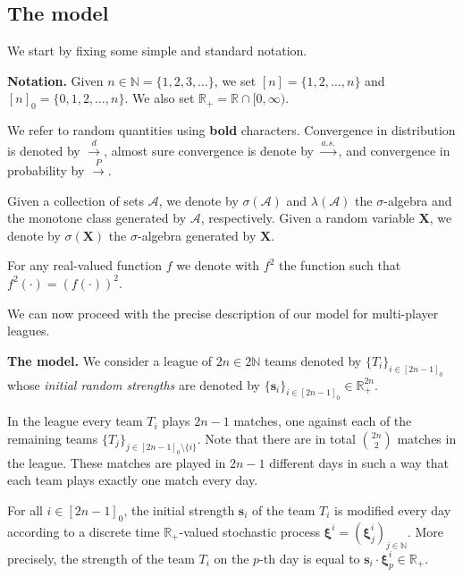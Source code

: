 \documentclass[11pt,a4paper,oneside]{article}
\theoremstyle{definition}
\theoremstyle{remark}
\def\N{\mathbb{N}}
\def\R{\mathbb{R}}
\begin{document}
\subsection{The model}\label{sect:the_model}

We start by fixing some simple and standard notation.

\bigskip

\textbf{Notation.} 
Given $n\in\N=\{1,2,3,\dots\}$, we set $[n]=\{1,2,\dots,n\}$ and $[n]_0=\{0,1,2,\dots,n\}$. We also set $\R_+=\R\cap[0,\infty)$. 

We refer to random quantities using \textbf{bold} characters. Convergence in distribution is denoted by $\xrightarrow{d}$, almost sure convergence is denote by $\xrightarrow{a.s.}$, and convergence in probability by $\xrightarrow{P}$. 

Given a collection of sets $\mathcal A$, we denote by $\sigma\left(\mathcal A\right)$ and $\lambda\left(\mathcal A\right)$ the $\sigma$-algebra and the monotone class generated by $\mathcal A$, respectively. Given a random variable $\bm X$, we denote by $\sigma\left(\bm X\right)$  the $\sigma$-algebra generated by $\bm X$.

For any real-valued function $f$ we denote with $f^2$ the function such that $f^2(\cdot)=(f(\cdot))^2$.

\bigskip

\noindent We can now proceed with the precise description of our model for multi-player leagues. 

\bigskip

\noindent\textbf{The model.} We consider a league of $2n\in2\N$ teams denoted by $\{T_{i}\}_{i\in [2n-1]_0}$ whose \emph{initial random strengths} are denoted by $\{\bm s_{i}\}_{i\in [2n-1]_0}\in \R_+^{2n}$.


In the league every team $T_i$ plays $2n-1$ matches, one against each of the remaining teams $\{T_{j}\}_{j\in [2n-1]_0\setminus\{i\}}$. Note that there are in total ${2n}\choose{2}$ matches in the league. These matches are played in $2n-1$ different days in such a way that each team plays exactly one match every day.

For all $i\in[2n-1]_0$, the initial strength $\bm s_i$ of the team $T_i$ is modified every day according to a discrete time $\R_+$-valued stochastic process $\bm \xi^i=(\bm \xi^i_j)_{j\in \N}$. More precisely, the strength of the team $T_i$ on the $p$-th day is equal to $\bm s_i\cdot \bm \xi^i_p\in \R_+$.
\end{document}
